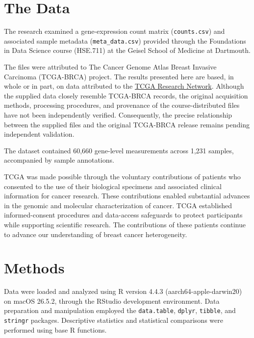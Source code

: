 \documentclass[12pt,letterpaper]{article}
\begin{document}

\section*{The Data}

The research examined a gene-expression count matrix (\texttt{counts.csv}) and associated sample metadata (\texttt{meta\_data.csv}) provided through the Foundations in Data Science course (HSE.711) at the Geisel School of Medicine at Dartmouth.

The files were attributed to The Cancer Genome Atlas Breast Invasive Carcinoma (TCGA-BRCA) project. The results presented here are based, in whole or in part, on data attributed to the \href{https://www.cancer.gov/tcga}{TCGA Research Network}. Although the supplied data closely resemble TCGA-BRCA records, the original acquisition methods, processing procedures, and provenance of the course-distributed files have not been independently verified. Consequently, the precise relationship between the supplied files and the original TCGA-BRCA release remains pending independent validation.

The dataset contained 60,660 gene-level measurements across 1,231 samples, accompanied by sample annotations.

TCGA was made possible through the voluntary contributions of patients who consented to the use of their biological specimens and associated clinical information for cancer research. These contributions enabled substantial advances in the genomic and molecular characterization of cancer. TCGA established informed-consent procedures and data-access safeguards to protect participants while supporting scientific research. The contributions of these patients continue to advance our understanding of breast cancer heterogeneity.


\section*{Methods}

Data were loaded and analyzed using R version 4.4.3 (aarch64-apple-darwin20) on macOS 26.5.2, through the RStudio development environment. Data preparation and manipulation employed the \texttt{data.table}, \texttt{dplyr}, \texttt{tibble}, and \texttt{stringr} packages. Descriptive statistics and statistical comparisons were performed using base R functions.
\end{document}
